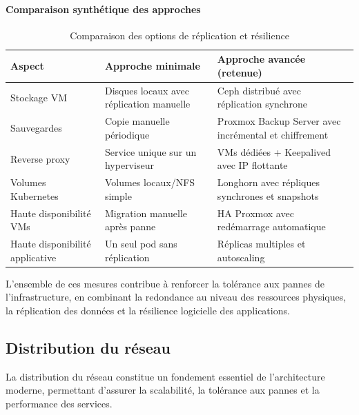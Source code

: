 \paragraph{Comparaison synthétique des approches}
\begin{table}[H]
	\renewcommand{\arraystretch}{1.3}
	\centering
	\begin{tabular}{|p{4cm}|p{5cm}|p{5cm}|}
		\hline
		\textbf{Aspect}                 & \textbf{Approche minimale}               & \textbf{Approche avancée (retenue)}                   \\
		\hline
		Stockage VM                     & Disques locaux avec réplication manuelle & Ceph distribué avec réplication synchrone             \\
		\hline
		Sauvegardes                     & Copie manuelle périodique                & Proxmox Backup Server avec incrémental et chiffrement \\
		\hline
		Reverse proxy                   & Service unique sur un hyperviseur        & VMs dédiées + Keepalived avec IP flottante            \\
		\hline
		Volumes Kubernetes              & Volumes locaux/NFS simple                & Longhorn avec répliques synchrones et snapshots       \\
		\hline
		Haute disponibilité VMs         & Migration manuelle après panne           & HA Proxmox avec redémarrage automatique               \\
		\hline
		Haute disponibilité applicative & Un seul pod sans réplication             & Réplicas multiples et autoscaling                     \\
		\hline
	\end{tabular}
	\caption{Comparaison des options de réplication et résilience}
\end{table}

L’ensemble de ces mesures contribue à renforcer la tolérance aux pannes de l’infrastructure, en combinant la redondance au niveau des ressources physiques, la réplication des données et la résilience logicielle des applications.

\subsection{Distribution du réseau}

La distribution du réseau constitue un fondement essentiel de l’architecture moderne, permettant d’assurer la scalabilité, la tolérance aux pannes et la performance des services.

